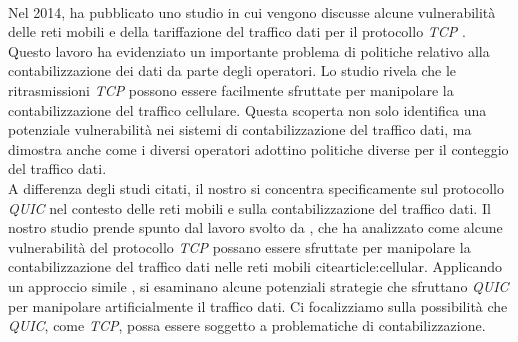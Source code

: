 \\
Nel 2014, \citeauthor{article:cellular} ha pubblicato uno studio in cui vengono discusse alcune vulnerabilità delle reti mobili e della tariffazione del traffico dati 
per il protocollo \emph{TCP} \cite{article:cellular}. Questo lavoro ha evidenziato un importante problema di politiche relativo alla contabilizzazione dei dati da parte degli operatori.
Lo studio rivela che le ritrasmissioni \emph{TCP} possono essere facilmente sfruttate per manipolare la contabilizzazione del traffico cellulare. 
Questa scoperta non solo identifica una potenziale vulnerabilità nei sistemi di contabilizzazione del traffico dati,
ma dimostra anche come i diversi operatori adottino politiche diverse per il conteggio del traffico dati.
\\
A differenza degli studi citati, il nostro si concentra specificamente sul protocollo \emph{QUIC} nel contesto delle reti mobili e sulla contabilizzazione del traffico dati.
Il nostro studio prende spunto dal lavoro svolto da \citeauthor{article:cellular}, che ha analizzato 
come alcune vulnerabilità del protocollo \emph{TCP} possano essere sfruttate per manipolare la contabilizzazione del traffico dati nelle reti mobili cite{article:cellular}.
Applicando un approccio simile , si esaminano alcune potenziali strategie che sfruttano \emph{QUIC} per manipolare artificialmente il traffico dati.
Ci focalizziamo sulla possibilità che \emph{QUIC}, come \emph{TCP}, possa essere soggetto a problematiche di contabilizzazione.
